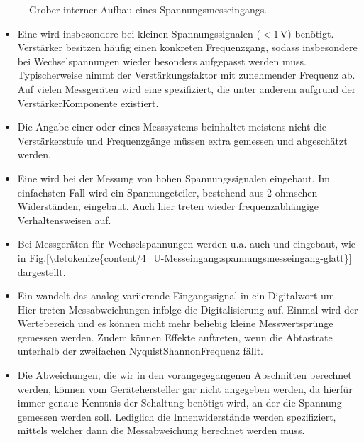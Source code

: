\documentclass[letterpaper,10pt,english]{jupyterBook}
\let\sphinxpxdimen\pdfpxdimen\else\newdimen\sphinxpxdimen
\begin{document}
\begin{figure}[htbp]
\centering
\capstart

\noindent\sphinxincludegraphics[width=400\sphinxpxdimen]{{spannungsmesseingang_ADU}.jpg}
\caption{Grober interner Aufbau eines Spannungsmesseingangs.}\label{\detokenize{content/4_U-Messeingang:spannungsmesseingang-adu}}\end{figure}
\begin{itemize}
\item {} 
\sphinxAtStartPar
Eine  wird insbesondere bei kleinen Spannungssignalen (\(<1\,\mathrm V\)) benötigt. Verstärker besitzen häufig einen konkreten Frequenzgang, sodass insbesondere bei Wechselspannungen wieder besonders aufgepasst werden muss. Typischerweise nimmt der Verstärkungsfaktor mit zunehmender Frequenz ab. Auf vielen Messgeräten wird eine  spezifiziert, die unter anderem aufgrund der Verstärker\sphinxhyphen{}Komponente existiert.

\item {} 
\sphinxAtStartPar
Die Angabe einer  oder  eines Messsystems beinhaltet meistens nicht die Verstärkerstufe und Frequenzgänge müssen extra gemessen und abgeschätzt werden.

\item {} 
\sphinxAtStartPar
Eine  wird bei der Messung von hohen Spannungssignalen eingebaut. Im einfachsten Fall wird ein Spannungeteiler, bestehend aus 2 ohmschen Widerständen, eingebaut. Auch hier treten wieder frequenzabhängige Verhaltensweisen auf.

\item {} 
\sphinxAtStartPar
Bei Messgeräten für Wechselspannungen werden u.a. auch  und  eingebaut, wie in \hyperref[\detokenize{content/4_U-Messeingang:spannungsmesseingang-glatt}]{Fig.\@ \ref{\detokenize{content/4_U-Messeingang:spannungsmesseingang-glatt}}} dargestellt.

\item {} 
\sphinxAtStartPar
Ein  wandelt das analog variierende Eingangssignal in ein Digitalwort um. Hier treten Messabweichungen infolge die Digitalisierung auf. Einmal wird der Wertebereich  und es können nicht mehr beliebig kleine Messwertsprünge gemessen werden. Zudem können \sphinxhyphen{}Effekte auftreten, wenn die Abtastrate unterhalb der zweifachen Nyquist\sphinxhyphen{}Shannon\sphinxhyphen{}Frequenz fällt.

\item {} 
\sphinxAtStartPar
Die Abweichungen, die wir in den vorangegegangenen Abschnitten berechnet werden, können vom Gerätehersteller gar nicht angegeben werden, da hierfür immer genaue Kenntnis der Schaltung benötigt wird, an der die Spannung gemessen werden soll. Lediglich die Innenwiderstände werden spezifiziert, mittels welcher dann die Messabweichung berechnet werden muss.

\end{itemize}
\end{document}
